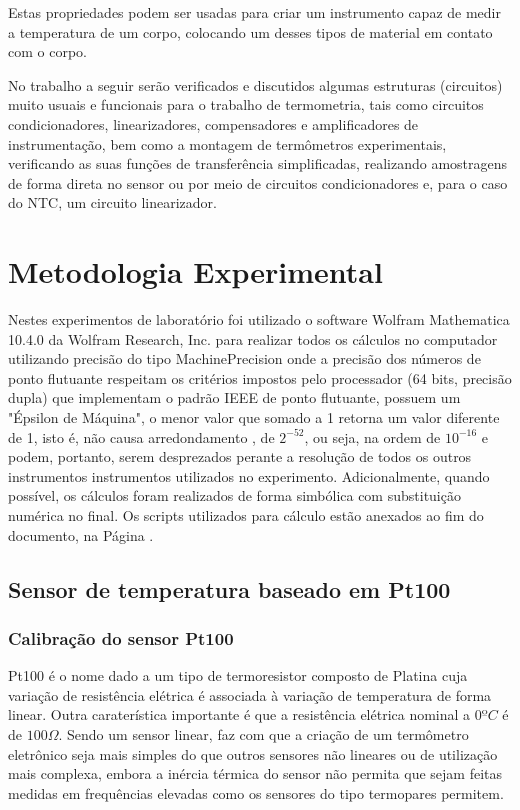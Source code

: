 \documentclass[a4paper]{instrumentacao}
\begin{document}
Estas propriedades podem ser usadas para criar um instrumento capaz de medir a temperatura de um corpo, colocando um desses tipos de material em contato com o corpo.

No trabalho a seguir serão verificados e discutidos algumas estruturas (circuitos) muito usuais e funcionais para o trabalho de termometria, tais como circuitos condicionadores, linearizadores, compensadores e amplificadores de instrumentação, bem como a montagem de termômetros experimentais, verificando as suas funções de transferência simplificadas, realizando amostragens de forma direta no sensor ou por meio de circuitos condicionadores e, para o caso do NTC, um circuito linearizador.

\chapter{Metodologia Experimental}

Nestes experimentos de laboratório foi utilizado o software Wolfram Mathematica 10.4.0 da Wolfram Research, Inc. para realizar todos os cálculos no computador utilizando precisão do tipo MachinePrecision\cite{mathematica-numerial-precision} onde a precisão dos números de ponto flutuante respeitam os critérios impostos pelo processador (64 bits, precisão dupla) que implementam o padrão IEEE de ponto flutuante, possuem um "Épsilon de Máquina", o menor valor que somado a 1 retorna um valor diferente de 1, isto é, não causa arredondamento \cite{wikipedia-epsilon}, de $2^{-52}$, ou seja, na ordem de $10^{-16}$ e podem, portanto, serem desprezados perante a resolução de todos os outros instrumentos instrumentos utilizados no experimento. Adicionalmente, quando possível, os cálculos foram realizados de forma simbólica com substituição numérica no final. Os scripts utilizados para cálculo estão anexados ao fim do documento, na Página \pageref{ch:attachments}.

\section{Sensor de temperatura baseado em Pt100}
\label{ch:pt100}

\subsection{Calibração do sensor Pt100}
\label{sec:resistencia-pt100}

Pt100 é o nome dado a um tipo de termoresistor composto de Platina cuja variação de resistência elétrica é associada à variação de temperatura de forma linear. Outra caraterística importante é que a resistência elétrica nominal a $0ºC$ é de $100 \Omega$. Sendo um sensor linear, faz com que a criação de um termômetro eletrônico seja mais simples do que outros sensores não lineares ou de utilização mais complexa, embora a inércia térmica do sensor não permita que sejam feitas medidas em frequências elevadas como os sensores do tipo termopares permitem.
\end{document}

